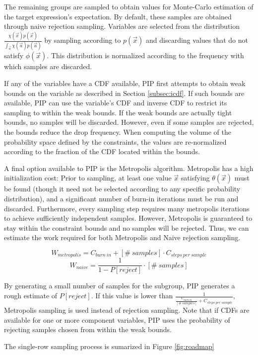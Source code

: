The remaining groups are sampled to obtain values for Monte-Carlo estimation of the target expression's expectation.  By default, these samples are obtained through naive rejection sampling.  Variables are selected from the distribution $\frac{\chi(\vec{x})p(\vec{x})}{\int_{\vec{a}} \chi(\vec{a})p(\vec{a})}$ by sampling according to $p(\vec{x})$ and discarding values that do not satisfy $\phi(\vec{x})$.  This distribution is normalized according to the frequency with which samples are discarded.  

If any of the variables have a CDF available, PIP first attempts to obtain weak bounds on the variable as described in Section \ref{subsec:icdf}.  If such bounds are available, PIP can use the variable's CDF and inverse CDF to restrict its sampling to within the weak bounds.  If the weak bounds are actually tight bounds, no samples will be discarded.  However, even if some samples are rejected, the bounds reduce the drop frequency.  When computing the volume of the probability space defined by the constraints, the values are re-normalized according to the fraction of the CDF located within the bounds.

A final option available to PIP is the Metropolis algorithm.  Metropolis has a high initialization cost: Prior to sampling, at least one value $\vec x$ satisfying $\theta(\vec x)$ must be found (though it need not be selected according to any specific probability distribution), and a significant number of burn-in iterations must be run and discarded.  Furthermore, every sampling step requires many metropolis iterations to achieve sufficiently independent samples.  However, Metropolis is guaranteed to stay within the constraint bounds and no samples will be rejected.  Thus, we can estimate the work required for both Metropolis and Naive rejection sampling.

$$W_{metropolis} = C_{burn\ in} + [\#\ samples] \cdot C_{steps\ per\ sample}$$
$$W_{naive} = \frac{1}{1-P[reject]} \cdot [\#\ samples]$$

By generating a small number of samples for the subgroup, PIP generates a rough estimate of $P[reject]$.  If this value is lower than $\frac{1}{\frac{C_{burn\ in}}{[\#\ samples]} + C_{steps\ per\ sample}}$, Metropolis sampling is used instead of rejection sampling.  Note that if CDFs are available for one or more component variables, PIP uses the probability of rejecting samples chosen from within the weak bounds.

The single-row sampling process is sumarized in Figure \ref{fig:roadmap}

